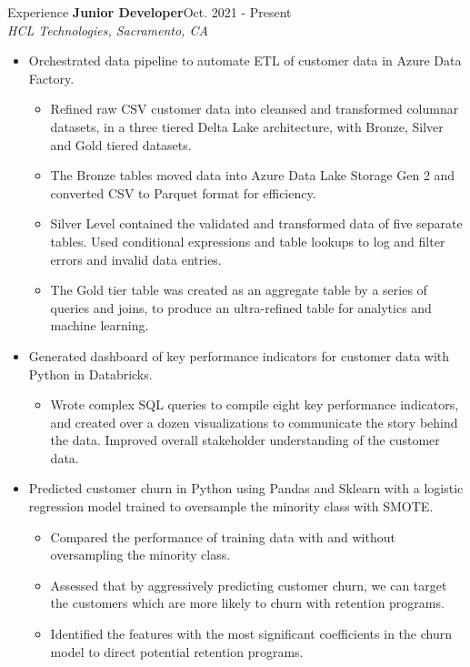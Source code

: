 \documentclass{resume} %
\begin{document}
\begin{rSection}{Experience}
    \textbf{Junior Developer}\hfill{Oct. 2021 - Present}\\
    \textit{HCL Technologies, Sacramento, CA} 
    \begin{itemize}
        \item Orchestrated data pipeline to automate ETL of customer data in Azure Data Factory.
            \begin{itemize}
                \item Refined raw CSV customer data into cleansed and transformed columnar
                    datasets, in a three tiered Delta Lake architecture, with Bronze, Silver and
                    Gold tiered datasets.
                \item The Bronze tables moved data into Azure Data Lake Storage Gen 2 and
                    converted CSV to Parquet format for efficiency.
                \item Silver Level contained the validated and transformed data of five separate
                    tables. Used conditional expressions and table lookups to log and filter
                    errors and invalid data entries.
                \item The Gold tier table was created as an aggregate table by a series of queries
                    and joins, to produce an ultra-refined table for analytics and machine
                    learning.
            \end{itemize}
        \item Generated dashboard of key performance indicators for customer data with Python in
            Databricks.
            \begin{itemize}
                \item Wrote complex SQL queries to compile eight key performance indicators, and
                    created over a dozen visualizations to communicate the story behind the data.
                    Improved overall stakeholder understanding of the customer data.
            \end{itemize}
        \item Predicted customer churn in Python using Pandas and Sklearn with a logistic
            regression model trained to oversample the minority class with SMOTE. 
            \begin{itemize}
                \item Compared the performance of training data with and without oversampling
                    the minority class. 
                \item Assessed that by aggressively predicting customer churn, we can target the 
                    customers which are more likely to churn with retention programs.
                \item Identified the features with the most significant coefficients in the
                    churn model to direct potential retention programs.
            \end{itemize}


\end{itemize}
\end{rSection}
\end{document}
